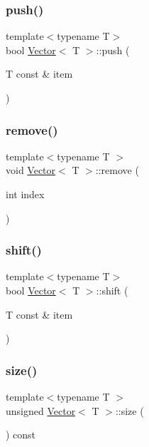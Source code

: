 \mbox{\label{classVector_ad15116a272b1924dc11e3543a8fc95d8}} 
\subsubsection{\texorpdfstring{push()}{push()}}
{\footnotesize\ttfamily template$<$typename T$>$ \\
bool \hyperlink{classVector}{Vector}$<$ T $>$\+::push (\begin{DoxyParamCaption}\item[{T const \&}]{item }\end{DoxyParamCaption})}

\mbox{\label{classVector_abc1ce95078c61fd5826583b0de7279b4}} 
\subsubsection{\texorpdfstring{remove()}{remove()}}
{\footnotesize\ttfamily template$<$typename T $>$ \\
void \hyperlink{classVector}{Vector}$<$ T $>$\+::remove (\begin{DoxyParamCaption}\item[{int}]{index }\end{DoxyParamCaption})}

\mbox{\label{classVector_adb54584983bf6750f60d5ad375f6c603}} 
\subsubsection{\texorpdfstring{shift()}{shift()}}
{\footnotesize\ttfamily template$<$typename T$>$ \\
bool \hyperlink{classVector}{Vector}$<$ T $>$\+::shift (\begin{DoxyParamCaption}\item[{T const \&}]{item }\end{DoxyParamCaption})}

\mbox{\label{classVector_a7eef7a769093f4486f3b2083436bf270}} 
\subsubsection{\texorpdfstring{size()}{size()}}
{\footnotesize\ttfamily template$<$typename T $>$ \\
unsigned \hyperlink{classVector}{Vector}$<$ T $>$\+::size (\begin{DoxyParamCaption}{ }\end{DoxyParamCaption}) const}

